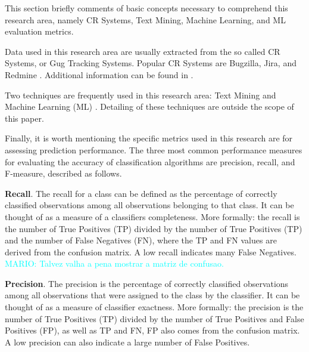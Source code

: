 \documentclass[10pt, conference]{IEEEtran}
\newcommand{\luiz}[1]{\noindent\textcolor{orange}{LUIZ: {#1}}}
\newcommand{\mario}[1]{\noindent\textcolor{cyan}{MARIO: {#1}}}
\newcommand{\luiz}[1]{}
\newcommand{\mario}[1]{}
\begin{document}
This section briefly comments of basic concepts necessary to comprehend this research area, namely CR Systems, Text Mining, Machine Learning, and ML evaluation metrics.

Data used in this research area are usually extracted from the so called CR Systems, or Gug Tracking Systems. Popular CR Systems are Bugzilla, Jira, and Redmine \cite{Tian2012}. Additional information can be found in \cite{Pressman2009}.

Two techniques are frequently used in this research area: Text Mining  \cite{Feldman2007} \cite{Williams2011} and Machine Learning (ML) \cite{Williams2011} \cite{Surya2016} \cite{Russell2010} \cite{Breiman2001}. Detailing of these techniques are outside the scope of this paper.

Finally, it is worth mentioning the specific metrics used in this research are for assessing prediction performance. The three most common performance measures for evaluating the accuracy of classification algorithms are precision, recall, and F-measure, described as follows.
%

\textbf{Recall}. The recall for a class can be defined as the percentage of correctly classified observations among all observations belonging to that class. It can be thought of as a measure of a classifiers completeness. More formally\cite{Facelli2015}: the recall is the number of True Positives (TP) divided by the number of True Positives (TP) and the number of False Negatives (FN), where the TP and FN values are derived from the confusion matrix. A low recall indicates many False Negatives\cite{Zhao2013}. \mario{Talvez valha a pena mostrar a matriz de confusao.}

\textbf{Precision}. The precision is the percentage of correctly classified observations among all observations that were assigned to the class by the classifier. It can be thought of as a measure of classifier exactness. More formally\cite{Facelli2015}: the precision is the number of True Positives (TP) divided by the number of True Positives and False Positives (FP), as well as TP and FN, FP also comes from the confusion matrix. A low precision can also indicate a large number of False Positives\cite{Zhao2013}.
\end{document}
